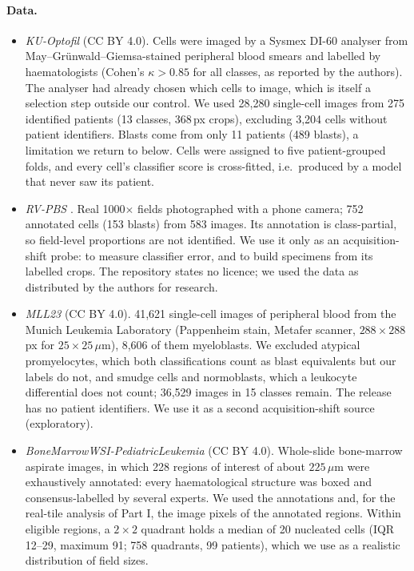 \documentclass[11pt]{article}
\theoremstyle{remark}
\theoremstyle{definition}
\begin{document}
\paragraph{Data.}
\begin{itemize}
\item \emph{KU-Optofil} \cite{yarikan2026kuoptofil} (CC BY 4.0). Cells were imaged by a Sysmex DI-60 analyser from May--Gr\"unwald--Giemsa-stained peripheral blood smears and labelled by haematologists (Cohen's $\kappa>0.85$ for all classes, as reported by the authors). The analyser had already chosen which cells to image, which is itself a selection step outside our control. We used 28,280 single-cell images from 275 identified patients (13 classes, 368\,px crops), excluding 3,204 cells without patient identifiers. Blasts come from only 11 patients (489 blasts), a limitation we return to below. Cells were assigned to five patient-grouped folds, and every cell's classifier score is cross-fitted, i.e.\ produced by a model that never saw its patient.
\item \emph{RV-PBS} \cite{rvpbs2024}. Real 1000$\times$ fields photographed with a phone camera; 752 annotated cells (153 blasts) from 583 images. Its annotation is class-partial, so field-level proportions are not identified. We use it only as an acquisition-shift probe: to measure classifier error, and to build specimens from its labelled crops. The repository states no licence; we used the data as distributed by the authors for research.
\item \emph{MLL23} \cite{shetabboushehri2025mll23} (CC BY 4.0). 41,621 single-cell images of peripheral blood from the Munich Leukemia Laboratory (Pappenheim stain, Metafer scanner, $288\times288$\,px for $25\times25\,\mu$m), 8,606 of them myeloblasts. We excluded atypical promyelocytes, which both classifications count as blast equivalents but our labels do not, and smudge cells and normoblasts, which a leukocyte differential does not count; 36,529 images in 15 classes remain. The release has no patient identifiers. We use it as a second acquisition-shift source (exploratory).
\item \emph{BoneMarrowWSI-PediatricLeukemia} \cite{hofener2025bmwsi,hofener2025descriptor} (CC BY 4.0). Whole-slide bone-marrow aspirate images, in which 228 regions of interest of about $225\,\mu$m were exhaustively annotated: every haematological structure was boxed and consensus-labelled by several experts. We used the annotations and, for the real-tile analysis of Part I, the image pixels of the annotated regions. Within eligible regions, a $2\times2$ quadrant holds a median of 20 nucleated cells (IQR 12--29, maximum 91; 758 quadrants, 99 patients), which we use as a realistic distribution of field sizes.
\end{itemize}
\end{document}
